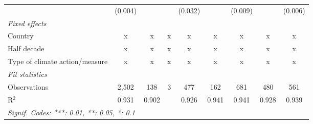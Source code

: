 \begin{table}[htbp]
\begin{tabular}{lcccccccc}
                                                                       & (0.004)       &                           &              & (0.032)        &                  & (0.009)         &                 & (0.006)\\   
      \emph{Fixed effects}\\
      Country                                                          & x             & x                         & x            & x              & x                & x               & x               & x\\  
      Half decade                                                      & x             & x                         & x            & x              & x                & x               & x               & x\\  
      Type of climate action/measure                                   & x             & x                         & x            & x              & x                & x               & x               & x\\  
      \midrule \emph{Fit statistics}\\
      Observations                                                     & 2,502         & 138                       & 3            & 477            & 162              & 681             & 480             & 561\\  
      R$^2$                                                            & 0.931         & 0.902                     &              & 0.926          & 0.941            & 0.941           & 0.928           & 0.939\\  
      \midrule
      \multicolumn{9}{l}{\emph{Signif. Codes: ***: 0.01, **: 0.05, *: 0.1}}\\
   \end{tabular}
\end{table}


